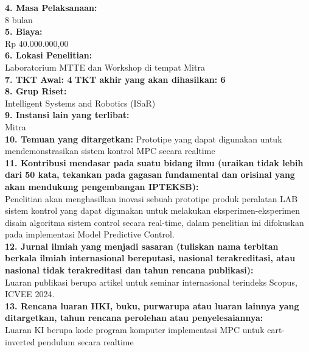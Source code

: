 \hspace{-0.6cm}\textbf{4. Masa Pelaksanaan:}\\
8 bulan\\

\hspace{-0.6cm}\textbf{5. Biaya:}\\
Rp 40.000.000,00\\

\hspace{-0.6cm}\textbf{6. Lokasi Penelitian:}\\
Laboratorium MTTE dan Workshop di tempat Mitra \\

\hspace{-0.6cm}\textbf{7. TKT Awal: 4}\hspace{1cm} \textbf{TKT akhir yang akan dihasilkan: 6}\\

\hspace{-0.6cm}\textbf{8. Grup Riset:}\\
Intelligent Systems and Robotics (ISaR)\\

\hspace{-0.6cm}\textbf{9. Instansi lain yang terlibat:}\\
Mitra\\

\hspace{-0.6cm}\textbf{10. Temuan yang ditargetkan:}
Prototipe yang dapat digunakan untuk mendemonstrasikan sistem kontrol MPC secara realtime \\


\hspace{-0.6cm}\textbf{11. Kontribusi mendasar pada suatu bidang ilmu
(uraikan tidak lebih dari 50 kata, tekankan pada gagasan fundamental dan orisinal yang akan mendukung pengembangan IPTEKSB):}\\
Penelitian akan menghasilkan inovasi sebuah prototipe produk peralatan LAB sistem kontrol yang dapat digunakan untuk melakukan eksperimen-eksperimen disain algoritma sistem control secara real-time, dalam penelitian ini difokuskan pada implementasi Model Predictive Control.\\

\hspace{-0.6cm}\textbf{12. Jurnal ilmiah yang menjadi sasaran (tuliskan nama terbitan berkala ilmiah internasional bereputasi, nasional terakreditasi, atau nasional tidak terakreditasi dan tahun rencana publikasi): }\\
Luaran publikasi berupa artikel untuk seminar internasional terindeks Scopus, ICVEE 2024.\\

\hspace{-0.6cm}\textbf{13. Rencana luaran HKI, buku, purwarupa atau luaran lainnya yang ditargetkan, tahun rencana perolehan atau penyelesaiannya:}\\
Luaran KI berupa kode program komputer implementasi MPC untuk cart-inverted pendulum secara realtime 
\newpage
